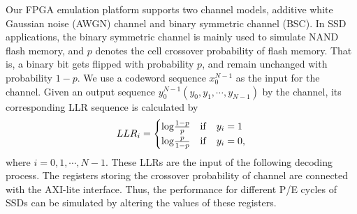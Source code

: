 \documentclass{article}
\begin{document}
Our FPGA emulation platform supports two channel models, additive white Gaussian noise (AWGN) channel and binary symmetric channel (BSC). In SSD applications, the binary symmetric channel is mainly used to simulate NAND flash memory, and $p$ denotes the cell crossover probability of flash memory. That is, a binary bit gets flipped with probability $p$, and remain unchanged with probability $1 - p$. We use a codeword sequence $x^{N-1}_0$ as the input for the channel. Given an output sequence $y^{N-1}_0 (y_0, y_1,\cdots,y_{N-1})$ by the channel, its corresponding LLR sequence is calculated by
\begin{equation}
\begin{array}{l}
$$LLR_i  =
\begin{cases}
\mathrm{log}  \frac{1-p}{p}     &\mathrm{if}  \quad y_i = 1   \\
\mathrm{log}  \frac{p}{1-p}     &\mathrm{if}  \quad y_i = 0,
\end{cases}$$
\end{array}
\end{equation}
where $i=0, 1, \cdots, N-1$.
These LLRs are the input of the following decoding process. The registers storing the crossover probability of channel are connected with the AXI-lite interface. Thus, the performance for different P/E cycles of SSDs can be simulated by altering the values of these registers.



%
\end{document}
